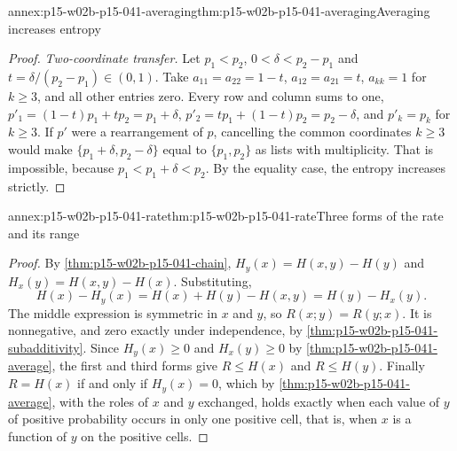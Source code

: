 \begin{annexitem}{annex:p15-w02b-p15-041-averaging}{thm:p15-w02b-p15-041-averaging}{Averaging increases entropy}
\begin{proof}
\emph{Two-coordinate transfer.} Let \(p_1<p_2\),
\(0<\delta<p_2-p_1\) and \(t=\delta/(p_2-p_1)\in(0,1)\). Take
\(a_{11}=a_{22}=1-t\), \(a_{12}=a_{21}=t\), \(a_{kk}=1\) for
\(k\geq3\), and all other entries zero. Every row and column sums to
one, \(p'_1=(1-t)p_1+tp_2=p_1+\delta\),
\(p'_2=tp_1+(1-t)p_2=p_2-\delta\), and \(p'_k=p_k\) for \(k\geq3\).
If \(p'\) were a rearrangement of \(p\), cancelling the common
coordinates \(k\geq3\) would make \(\{p_1+\delta,p_2-\delta\}\) equal
to \(\{p_1,p_2\}\) as lists with multiplicity. That is impossible,
because \(p_1<p_1+\delta<p_2\). By the equality case, the entropy
increases strictly.
\end{proof}
\end{annexitem}

\begin{annexitem}{annex:p15-w02b-p15-041-rate}{thm:p15-w02b-p15-041-rate}{Three forms of the rate and its range}
\begin{proof}
By \cref{thm:p15-w02b-p15-041-chain}, \(H_y(x)=H(x,y)-H(y)\) and
\(H_x(y)=H(x,y)-H(x)\). Substituting,
\[
 H(x)-H_y(x)=H(x)+H(y)-H(x,y)=H(y)-H_x(y).
\]
The middle expression is symmetric in \(x\) and \(y\), so
\(R(x;y)=R(y;x)\). It is nonnegative, and zero exactly under
independence, by \cref{thm:p15-w02b-p15-041-subadditivity}. Since
\(H_y(x)\geq0\) and \(H_x(y)\geq0\) by
\cref{thm:p15-w02b-p15-041-average}, the first and third forms give
\(R\leq H(x)\) and \(R\leq H(y)\). Finally \(R=H(x)\) if and only if
\(H_y(x)=0\), which by \cref{thm:p15-w02b-p15-041-average}, with the
roles of \(x\) and \(y\) exchanged, holds exactly when each value of
\(y\) of positive probability occurs in only one positive cell, that
is, when \(x\) is a function of \(y\) on the positive cells.
\end{proof}
\end{annexitem}

